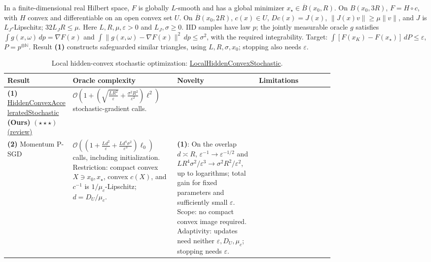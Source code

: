 \begin{table}[tp]
\centering
\caption{Local hidden-convex stochastic optimization: \href{https://github.com/k3nfalt/longtails/blob/main/LongTails/Setups/LocalHiddenConvexStochastic.lean}{LocalHiddenConvexStochastic}.}\label{tab:LocalHiddenConvexStochastic}
\parbox{\linewidth}{\footnotesize In a finite-dimensional real Hilbert space, $F$ is globally $L$-smooth and has a global minimizer $x_\star\in\overline B(x_0,R)$. On $B(x_0,3R)$, $F=H\circ c$, with $H$ convex and differentiable on an open convex set $U$. On $\overline B(x_0,2R)$, $c(x)\in U$, $Dc(x)=J(x)$, $\|J(x)v\|\ge\mu\|v\|$, and $J$ is $L_J$-Lipschitz; $32L_JR\le\mu$. Here $L,R,\mu,\varepsilon>0$ and $L_J,\sigma\ge0$. IID samples have law $p$; the jointly measurable oracle $g$ satisfies $\int g(x,\omega)\,dp=\nabla F(x)$ and $\int\|g(x,\omega)-\nabla F(x)\|^2\,dp\le\sigma^2$, with the required integrability. Target: $\int[F(x_K)-F(x_\star)]\,dP\le\varepsilon$, $P=p^{\otimes\mathbb N}$. Result \textbf{(1)} constructs safeguarded similar triangles, using $L,R,\sigma,x_0$; stopping also needs $\varepsilon$.}\par\smallskip
\begin{threeparttable}
\footnotesize
\setlength{\tabcolsep}{4pt}\renewcommand{\arraystretch}{1.25}
\begin{tabularx}{\linewidth}{@{}>{\raggedright\arraybackslash}p{0.20\linewidth}>{\raggedright\arraybackslash}p{0.32\linewidth}>{\raggedright\arraybackslash}p{0.25\linewidth}>{\raggedright\arraybackslash}X@{}}
\toprule
\textbf{Result} & \textbf{Oracle complexity} & \textbf{Novelty} & \textbf{Limitations} \\
\midrule
\textbf{(1)} \href{https://github.com/k3nfalt/longtails/blob/main/LongTails/Theorems/HiddenConvexAcceleratedStochastic.lean}{Hidden\allowbreak Convex\allowbreak Accelerated\allowbreak Stochastic} \textbf{(Ours)} $(\star\star\star)$ \href{https://github.com/k3nfalt/longtails/blob/main/scripts/reviews/HiddenConvexAcceleratedStochastic.md}{(review)}
& $\mathcal{O}\!\left(1+\left(\sqrt{\frac{LR^2}{\varepsilon}}+\frac{\sigma^2R^2}{\varepsilon^2}\right)\ell^2\right)$ stochastic-gradient calls. & & \\
\midrule[1.2pt]
\textbf{(2)} Momentum P-SGD \citep[Thm.~8]{lhcsFatkhullin2024v2}
& $\mathcal{O}\!\left(\left(1+\frac{Ld^2}{\varepsilon}+\frac{Ld^4\sigma^2}{\varepsilon^3}\right)\ell_0\right)$ calls, including initialization. Restriction: compact convex $X\ni x_0,x_\star$, convex $c(X)$, and $c^{-1}$ is $1/\mu_c$-Lipschitz; $d=D_U/\mu_c$.
& \textbf{(1)}: On the overlap $d\asymp R$, $\varepsilon^{-1}\to\varepsilon^{-1/2}$ and $LR^4\sigma^2/\varepsilon^3\to\sigma^2R^2/\varepsilon^2$, up to logarithms; total gain for fixed parameters and sufficiently small $\varepsilon$. Scope: no compact convex image required. Adaptivity: updates need neither $\varepsilon,D_U,\mu_c$; stopping needs $\varepsilon$.

\end{tabularx}
\end{threeparttable}
\end{table}

